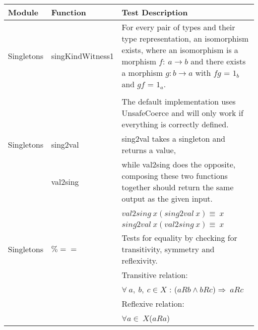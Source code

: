 \begin{center}
     \begin{adjustwidth}{-2cm}{}
    \begin{longtable}{ |m{1.8cm}|m{3.2cm}|m{9cm}| } 
        \hline
         Module & Function & Test Description \\ 
        \hline \hline
         Singletons & singKindWitness1 & For every pair of types 
        and their type representation, an isomorphism exists, where an 
        isomorphism is a morphism $f:\ a \rightarrow b$ and there exists a 
        morphism $g: b \rightarrow a$ with $fg$ = $1_b$ and $gf$ = $1_a$.
        \\  & & 
        \\  & & The 
        default implementation uses UnsafeCoerce and will only work if 
        everything is correctly defined.    
         
        \\\hline 
        Singletons & sing2val & sing2val takes a singleton and returns a value, 
        \\ &val2sing & while val2sing does the opposite, composing these two 
         functions together should return the same output as the given input. 
         \\  & &
         \\  & & $val2sing\ x (sing2val\ x) \equiv \ x$ 
         \\  & & $sing2val\ x (val2sing\ x) \equiv \ x$
         
         \\\hline
        Singletons& $\%==$ & Tests for equality by checking for transitivity, 
        symmetry and reflexivity.
        
        \\ & & Transitive relation: 
        \\ & &  
        $\forall\ a,\ b,\ c \in  X$ : ($aRb \wedge bRc$)$ \Rightarrow\ aRc$
        
        \\ & & Reflexive relation:
        \\ & & 
        $\forall a \in\ X $($aRa$)   
         

\end{longtable}
\end{adjustwidth}
\end{center}
